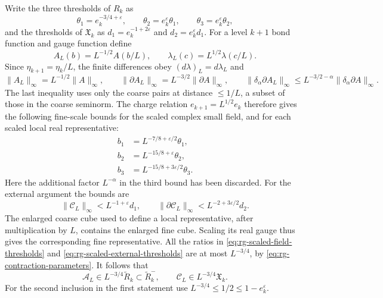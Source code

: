 Write the three thresholds of $R_k$ as
\[
 \theta_1=e_k^{-3/4+\varepsilon},\qquad
 \theta_2=e_k^\varepsilon\theta_1,\qquad
 \theta_3=e_k^\varepsilon\theta_2,
\]
and the thresholds of $\mathfrak X_k$ as
$d_1=e_k^{-1+2\varepsilon}$ and $d_2=e_k^\varepsilon d_1$.
For a level $k+1$ bond function and gauge function define
\begin{equation}\label{eq:rg-connection-scaling}
 A_L(b)=L^{-1/2}A(b/L),\qquad
 \lambda_L(c)=L^{1/2}\lambda(c/L).
\end{equation}
Since $\eta_{k+1}=\eta_k/L$, the finite differences obey
$(d\lambda)_L=d\lambda_L$ and
\[
 \|A_L\|_\infty=L^{-1/2}\|A\|_\infty,\qquad
 \|\partial A_L\|_\infty=L^{-3/2}\|\partial A\|_\infty,\qquad
 \|\delta_\alpha\partial A_L\|_\infty
                \le L^{-3/2-\alpha}\|\delta_\alpha\partial A\|_\infty.
\]
The last inequality uses only the coarse pairs at distance
$\le1/L$, a subset of those in the coarse seminorm.
The charge relation $e_{k+1}=L^{1/2}e_k$ therefore gives
the following fine-scale bounds for the scaled complex
small field, and for each scaled local real representative:
\begin{equation}\label{eq:rg-scaled-field-thresholds}
 \begin{split}
 b_1&=L^{-7/8+\varepsilon/2}\theta_1,\\
 b_2&=L^{-15/8+\varepsilon}\theta_2,\\
 b_3&=L^{-15/8+3\varepsilon/2}\theta_3.
 \end{split}
\end{equation}
Here the additional factor $L^{-\alpha}$ in the third bound
has been discarded. For the external argument the bounds are
\begin{equation}\label{eq:rg-scaled-external-thresholds}
 \|\mathscr C_L\|_\infty<L^{-1+\varepsilon}d_1,\qquad
 \|\partial\mathscr C_L\|_\infty<L^{-2+3\varepsilon/2}d_2.
\end{equation}
The enlarged coarse cube used to define a local representative,
after multiplication by $L$, contains the enlarged fine cube.
Scaling its real gauge thus gives the corresponding fine
representative. All the ratios in
\eqref{eq:rg-scaled-field-thresholds} and
\eqref{eq:rg-scaled-external-thresholds} are at most $L^{-3/4}$,
by \eqref{eq:rg-contraction-parameters}. It follows that
\begin{equation}\label{eq:rg-scaled-domain-inclusion}
 \mathscr A_L\in L^{-3/4}\widetilde R_k
                     \subset\widetilde R_k^-,\qquad
 \mathscr C_L\in L^{-3/4}\mathfrak X_k.
\end{equation}
For the second inclusion in the first statement use
$L^{-3/4}\le1/2\le1-e_k^\varepsilon$.

